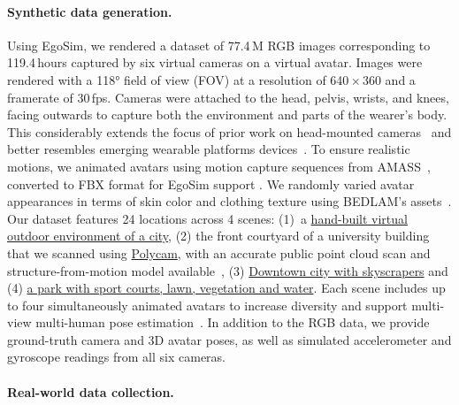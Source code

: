 \paragraph{Synthetic data generation.} 
Using EgoSim, we rendered a dataset of 77.4\,M RGB images corresponding to 119.4\,hours captured by six virtual cameras on a virtual avatar.
Images were rendered with a 118° field of view (FOV) at a resolution of 640\,$\times$\,360 and a framerate of 30\,fps.
Cameras were attached to the head, pelvis, wrists, and knees, facing outwards to capture both the environment and parts of the wearer's body.
This considerably extends the focus of prior work on head-mounted cameras~\cite{xuMo2Cap2RealtimeMobile2019jan, tome2019xr, rhodin2016egocap, akada2022unrealego} and better resembles emerging wearable platforms devices~\cite{zhao2021egoglass, grauman2022ego4d, zhang2022egobody}.
To ensure realistic motions, we animated avatars using motion capture sequences from AMASS~\cite{amass}, converted to FBX format for EgoSim support \cite{SMPL-X:2019}.
We randomly varied avatar appearances in terms of skin color and clothing texture using BEDLAM's assets~\cite{bedlam}.
Our dataset features 24 locations across 4 scenes: (1)~a \href{https://www.unrealengine.com/marketplace/en-US/product/6bb93c7515e148a1a0a0ec263db67d5b}{hand-built virtual outdoor environment of a city}, (2) the front courtyard of a university building that we scanned using \href{https://poly.cam/}{Polycam}, with an accurate public point cloud scan and structure-from-motion model available~\cite{sarlinLaMARBenchmarkingLocalization2022}, (3) \href{https://www.fab.com/listings/474a0598-ed86-40b6-baa1-c801d96ef4ab}{Downtown city with skyscrapers} and (4) \href{https://www.fab.com/listings/11cc2abb-126c-4452-9fe4-6f2381d96544}{a park with sport courts, lawn, vegetation and water}.
Each scene includes up to four simultaneously animated avatars to increase diversity and support multi-view multi-human pose estimation~\cite{khirodkar2023egohumans, aso2021portable}.
In addition to the RGB data, we provide ground-truth camera and 3D avatar poses, as well as simulated accelerometer and gyroscope readings from all six cameras.

\paragraph{Real-world data collection.}

